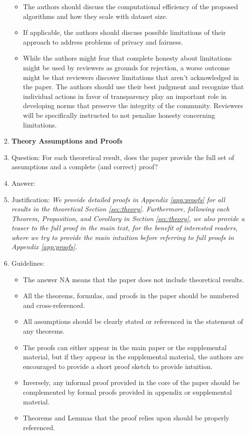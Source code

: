 \documentclass{article}
\theoremstyle{plain}
\begin{document}
\begin{enumerate}
\begin{itemize}
        \item The authors should discuss the computational efficiency of the proposed algorithms and how they scale with dataset size.
        \item If applicable, the authors should discuss possible limitations of their approach to address problems of privacy and fairness.
        \item While the authors might fear that complete honesty about limitations might be used by reviewers as grounds for rejection, a worse outcome might be that reviewers discover limitations that aren't acknowledged in the paper. The authors should use their best judgment and recognize that individual actions in favor of transparency play an important role in developing norms that preserve the integrity of the community. Reviewers will be specifically instructed to not penalize honesty concerning limitations.
    \end{itemize}

\item {\bf Theory Assumptions and Proofs}
    \item[] Question: For each theoretical result, does the paper provide the full set of assumptions and a complete (and correct) proof?
    \item[] Answer: \answerYes %
    \item[] Justification: \textit{We provide detailed proofs in Appendix \ref{app:proofs} for all results in the theoretical Section \ref{sec:theory}. Furthermore, following each Theorem, Proposition, and Corollary in Section \ref{sec:theory}, we also provide a teaser to the full proof in the main text, for the benefit of interested readers, where we try to provide the main intuition before referring to full proofs in Appendix \ref{app:proofs}}.
    \item[] Guidelines:
    \begin{itemize}
        \item The answer NA means that the paper does not include theoretical results. 
        \item All the theorems, formulas, and proofs in the paper should be numbered and cross-referenced.
        \item All assumptions should be clearly stated or referenced in the statement of any theorems.
        \item The proofs can either appear in the main paper or the supplemental material, but if they appear in the supplemental material, the authors are encouraged to provide a short proof sketch to provide intuition. 
        \item Inversely, any informal proof provided in the core of the paper should be complemented by formal proofs provided in appendix or supplemental material.
        \item Theorems and Lemmas that the proof relies upon should be properly referenced. 
    \end{itemize}


\end{enumerate}
\end{document}

